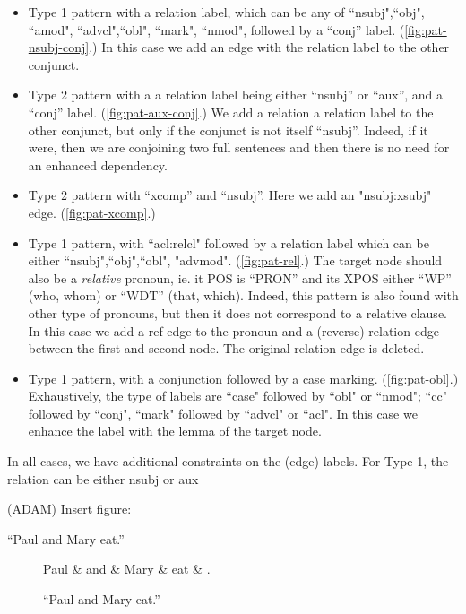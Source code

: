\documentclass[11pt,a4paper]{article}
\begin{document}
\begin{itemize}
\item Type 1 pattern with a relation label, which can be any of
  ``nsubj",``obj", ``amod", ``advcl",``obl", ``mark", ``nmod", followed by a
  ``conj'' label. (\cref{fig:pat-nsubj-conj}.) In this case we add an
  edge with the relation label to the other conjunct.
\item Type 2 pattern with a a relation label being either ``nsubj'' or
  ``aux'', and a ``conj'' label. (\cref{fig:pat-aux-conj}.) We add a relation a relation label to
  the other conjunct, but only if the conjunct is not itself
  ``nsubj''. Indeed, if it were, then we are conjoining two full
  sentences and then there is no need for an enhanced dependency.
\item Type 2 pattern with ``xcomp'' and ``nsubj''. Here we add an
  "nsubj:xsubj" edge. (\cref{fig:pat-xcomp}.)
\item Type 1 pattern, with ``acl:relcl" followed by a relation label
  which can be either ``nsubj",``obj",``obl",
  "advmod". (\cref{fig:pat-rel}.) The target node should also be a
  \emph{relative} pronoun, ie. it POS is ``PRON'' and its XPOS either
  ``WP'' (who, whom) or ``WDT'' (that, which). Indeed, this pattern is
  also found with other type of pronouns, but then it does not
  correspond to a relative clause.  In this case we add a ref edge to
  the pronoun and a (reverse) relation edge between the first and
  second node. The original relation edge is deleted.
\item Type 1 pattern, with a conjunction followed by a case
  marking. (\cref{fig:pat-obl}.) Exhaustively, the type of labels are ``case" followed by
  ``obl" or ``nmod"; ``cc" followed by ``conj", ``mark" followed by ``advcl"
  or ``acl". In this case we enhance the label with the lemma of the target node.
\end{itemize}
In all cases, we have additional constraints on the
(edge) labels. For Type 1, the relation can be either nsubj or aux


(ADAM) Insert figure:

``Paul and Mary eat.''

\begin{figure}[h]
    \centering
    \begin{dependency}
    \begin{deptext}[column sep=1em]
    Paul \& and \& Mary \& eat \& . \\
    \end{deptext}
    \end{dependency}
    \caption{``Paul and Mary eat.''}
\end{figure}
    
\end{document}
